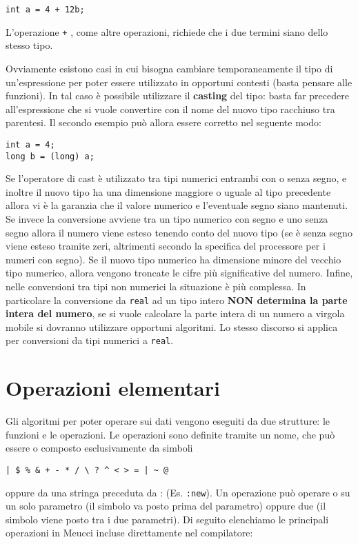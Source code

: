 \documentclass[10pt]{book}%
\newcommand{\e}{\`{e} }
\newcommand{\ac}[1]{\`{#1}}
\newcommand{\code}[1]{\texttt{#1}}
\renewcommand{\emph}[1]{\textbf{#1}}
\newenvironment{codeenv}{
\begin{mdframed}[backgroundcolor=black!20,topline=false,leftline=false,rightline=false,bottomline=false]
}
{\end{mdframed}}
\begin{document}
\begin{codeenv}
\begin{verbatim}
int a = 4 + 12b;
\end{verbatim}
\end{codeenv}
L'operazione \code + , come altre operazioni, richiede che i due termini siano dello stesso tipo.

Ovviamente esistono casi in cui bisogna cambiare temporaneamente il tipo di un'espressione per poter essere utilizzato in opportuni contesti (basta pensare alle funzioni). In tal caso \e possibile utilizzare il \emph{casting} del tipo: basta far precedere all'espressione che si vuole convertire con il nome del nuovo tipo racchiuso tra parentesi. Il secondo esempio pu\ac o allora essere corretto nel seguente modo:

\begin{codeenv}
\begin{verbatim}
int a = 4;
long b = (long) a;
\end{verbatim}
\end{codeenv}

Se l'operatore di cast \e utilizzato tra tipi numerici entrambi con o senza segno, e inoltre il nuovo tipo ha una dimensione maggiore o uguale al tipo precedente allora vi \e la garanzia che il valore numerico e l'eventuale segno siano mantenuti. Se invece la conversione avviene tra un tipo numerico con segno e uno senza segno allora il numero viene esteso tenendo conto del nuovo tipo (se \e senza segno viene esteso tramite zeri, altrimenti secondo la specifica del processore per i numeri con segno). Se il nuovo tipo numerico ha dimensione minore del vecchio tipo numerico, allora vengono troncate le cifre pi\ac u significative del numero. Infine, nelle conversioni tra tipi non numerici la situazione \e pi\ac u complessa. In particolare la conversione da \code{real} ad un tipo intero \emph{NON determina la parte intera del numero}, se si vuole calcolare la parte intera di un numero a virgola mobile si dovranno utilizzare opportuni algoritmi. Lo stesso discorso si applica per conversioni da tipi numerici a \code{real}.

\section{Operazioni elementari}
Gli algoritmi per poter operare sui dati vengono eseguiti da due strutture: le funzioni e le operazioni. Le operazioni sono definite tramite un nome, che pu\ac o essere o composto esclusivamente da simboli
\begin{verbatim}
| $ % & + - * / \ ? ^ < > = | ~ @
\end{verbatim}
oppure da una stringa preceduta da : (Es. \code{:new}). Un operazione pu\ac o operare o su un solo parametro (il simbolo va posto prima del parametro) oppure due (il simbolo viene posto tra i due parametri). Di seguito elenchiamo le principali operazioni in Meucci incluse direttamente nel compilatore:
\end{document}
